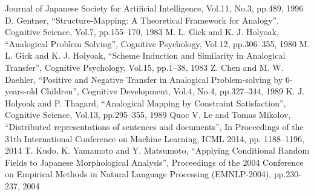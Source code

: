 \documentclass{deimj}
\begin{document}
\begin{thebibliography}{99}
      Journal of Japanese Society for Artificial Intelligence,  Vol.11, No.3,  pp.489, 1996
    D. Gentner,
      ``Structure-Mapping: A Theoretical Framework for Analogy'',
      Cognitive Science, Vol.7, pp.155–170, 1983
    M. L. Gick and K. J. Holyoak,
      ``Analogical Problem Solving'',
      Cognitive Psychology, Vol.12, pp.306–355, 1980
    M. L. Gick and K. J. Holyoak,
      ``Scheme Induction and Similarity in Analogical Transfer'',
      Cognitive Psychology, Vol.15, pp.1–38, 1983
    Z. Chen and M. W. Daehler,
      ``Positive and Negative Transfer in Analogical Problem-solving by 6-years-old Children'',
      Cognitive Development, Vol.4, No.4, pp.327–344, 1989
    K. J. Holyoak and P. Thagard,
      ``Analogical Mapping by Constraint Satisfaction'',
      Cognitive Science, Vol.13, pp.295–355, 1989
    Quoc V. Le and Tomas Mikolov,
      ``Distributed representations of sentences and documents'',
      In Proceedings of the 31th International Conference on Machine Learning, ICML 2014, pp. 1188–1196, 2014
    T. Kudo, K. Yamamoto and Y. Matsumoto,
      ``Applying Conditional Random Fields to Japanese Morphological Analysis'',
      Proceedings of the 2004 Conference on Empirical Methods in Natural Language Processing (EMNLP-2004), pp.230-237, 2004
\end{thebibliography}
\end{document}
